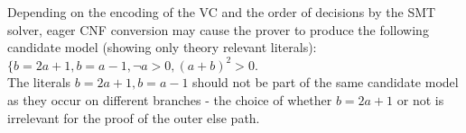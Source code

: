 Depending on the encoding of the VC and the order of decisions by the SMT solver, eager CNF conversion may cause the prover to produce the following candidate model (showing only theory relevant literals):\\
$\{b=2a+1, b=a-1, \lnot a>0, (a+b)^2>0$.\\
The literals $b=2a+1, b=a-1$ should not be part of the same candidate model as they occur on different branches - the choice of whether $b=2a+1$ or not is irrelevant for the proof of the outer else path.
%
%
